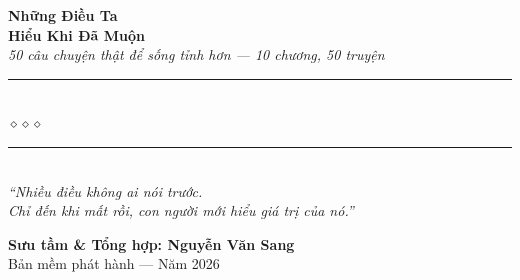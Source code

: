 \begin{titlepage}
\begin{center}
  {\fontsize{30}{36}\selectfont\bfseries\color{inkdark!80!black}
    Những Điều Ta}\\[0.35cm]
  {\fontsize{30}{36}\selectfont\bfseries\color{agedgold!85!black}
    Hiểu Khi Đã Muộn}\\[0.5cm]

  {\fontsize{16}{20}\selectfont\color{agedgold!90!black}\itshape
    50 câu chuyện thật để sống tỉnh hơn --- 10 chương, 50 truyện}\\[1cm]

  {\color{smokeblue!60}\rule{6cm}{1pt}}\\[5pt]
  {\color{agedgold!80!black}\large$\diamond$\hspace{1cm}$\diamond$\hspace{1cm}$\diamond$}\\[5pt]
  {\color{smokeblue!60}\rule{6cm}{1pt}}\\[1.4cm]

  {\normalsize\itshape\color{smokeblue!90!black}
   ``Nhiều điều không ai nói trước.\\
   Chỉ đến khi mất rồi, con người mới hiểu giá trị của nó.''}

  \vfill

  {\fontsize{16}{20}\selectfont\bfseries\color{smokeblue!90!black}
    Sưu tầm \& Tổng hợp: \textbf{Nguyễn Văn Sang}}\\[0.4cm]

  {\small\color{gray} Bản mềm phát hành --- Năm 2026}\\[0.5cm]
\end{center}

\afterpage{\nopagecolor}
\end{titlepage}